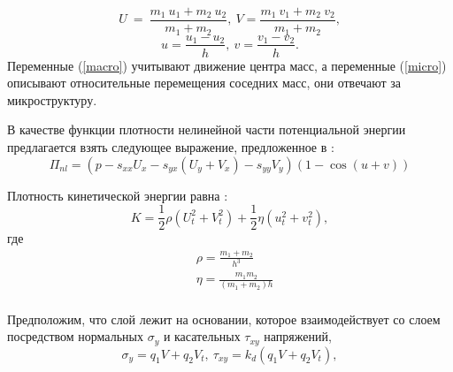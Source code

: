 \begin{equation}
	U~=~\frac{m_1~u_1+m_2~u_2}{m_1+m_2},~V=\frac{m_1~v_1+m_2~v_2}{m_1+m_2}, \label{macro}
\end{equation}
\begin{equation}
	u=\frac{u_1-u_2}{h},~v=\frac{v_1-v_2}{h}. \label{micro}
\end{equation}
Переменные (\ref{macro}) учитывают движение центра масс, а переменные (\ref{micro}) описывают относительные перемещения соседних масс, они отвечают за микроструктуру.


В качестве функции плотности нелинейной части потенциальной энергии предлагается взять следующее выражение, предложенное в \cite{bound_aeroplane, bound_porsp17}:
\begin{equation}
	\Pi_{nl} = \left( p - s_{xx} U_x - s_{yx} \left( U_y + V_x\right) - s_{yy} V_y\right) \left( 1- \cos{(u+v)}\right) \label{pot}
\end{equation}

Плотность кинетической энергии равна \cite{bound_porsp17}:
\begin{equation}
	K = \frac{1}{2} \rho (U_t^2 + V_t^2) + \frac{1}{2} \eta (u_t^2 + v_t^2), \label{kin}
\end{equation}
где
\begin{equation}
	\begin{aligned}
		& \rho = \frac{m_1+m_2}{h^3} \\ 
		& \eta = \frac{m_1 m_2}{(m_1 + m_2)h} \\
	\end{aligned}
\end{equation}

Предположим, что слой лежит на основании, которое взаимодействует со слоем посредством нормальных $\sigma_y$ и касательных $\tau_{xy}$ напряжений,
\begin{equation}
	\sigma_{y}=q_1 V + q_2 V_t , ~
	\tau_{xy}= k_d (q_1 V + q_2 V_t), \label{friction}
\end{equation}

